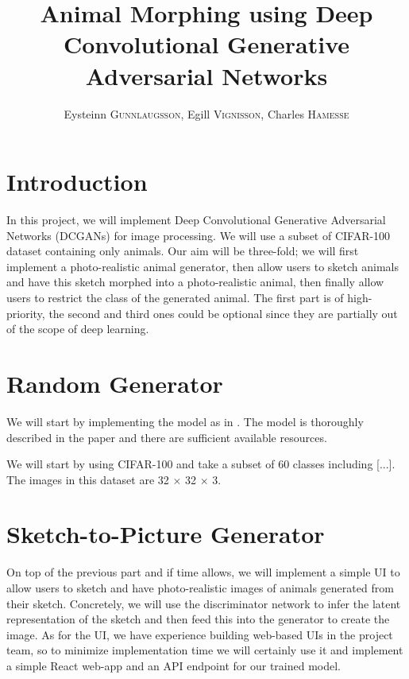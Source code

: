 \documentclass[a4paper]{article}
\title{Animal Morphing using Deep Convolutional Generative Adversarial Networks}
\author{
	Eysteinn \textsc{Gunnlaugsson},
	Egill \textsc{Vignisson},
	Charles \textsc{Hamesse}
}
\begin{document}
\maketitle


\section{Introduction}
In this project, we will implement Deep Convolutional Generative Adversarial Networks (DCGANs)  \cite{DBLP:journals/corr/RadfordMC15} for image processing. We will use a subset of CIFAR-100  dataset \cite{cifar100} containing only animals. Our aim will be three-fold; we will first implement a photo-realistic animal generator, then allow users to sketch animals and have this sketch morphed into a photo-realistic animal, then finally allow users to restrict the class of the generated animal. The first part is of high-priority, the second and third ones could be optional since they are partially out of the scope of deep learning.


%
%
%
\section{Random Generator}
We will start by implementing the model as in \cite{DBLP:journals/corr/RadfordMC15}. The model is thoroughly described in the paper and there are sufficient available resources.

We will start by using CIFAR-100 and take a subset of 60 classes including [...]. The images in this dataset are 32 $\times$ 32 $\times$ 3.



%
%
%
\section{Sketch-to-Picture Generator}

On top of the previous part and if time allows, we will implement a simple UI to allow users to sketch and have photo-realistic images of animals generated from their sketch. Concretely, we will use the discriminator network to infer the latent representation of the sketch and then feed this into the generator to create the image. As for the UI, we have experience building web-based UIs in the project team, so to minimize implementation time we will certainly use it and implement a simple React web-app and an API endpoint for our trained model.  
\end{document}
